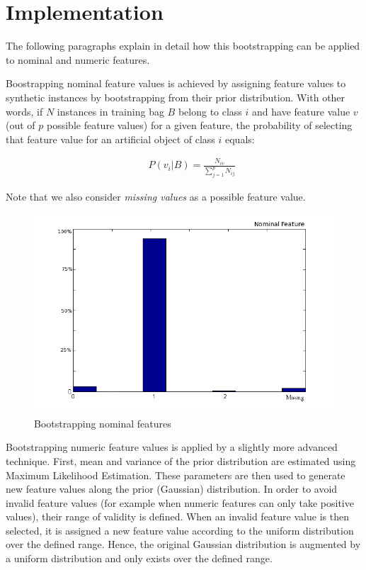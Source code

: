 \section{Implementation}\label{rnb-implementation}
The following paragraphs explain in detail how this bootstrapping can be applied to nominal and numeric features.

Boostrapping nominal feature values is achieved by assigning feature values to synthetic instances by bootstrapping from their prior distribution. With other words, if \(N\) instances in training bag $B$ belong to class \(i\) and have feature value $v$ (out of $p$ possible feature values) for a given feature, the probability of selecting that feature value for an artificial object of class $i$ equals:

\begin{eqnarray}
&& P(v_i|B)=\frac{N_{iv}}{\sum_{j=1}^p{N_{ij}}}
\end{eqnarray}

Note that we also consider \textit{missing values} as a possible feature value.

\begin{figure}[h]
\includegraphics[scale=0.65]{img/nominalEst.png}
\caption{Bootstrapping nominal features}
\end{figure}

Bootstrapping numeric feature values is applied by a slightly more advanced technique. First, mean and variance of the prior distribution are estimated using Maximum Likelihood Estimation. These parameters are then used to generate new feature values along the prior (Gaussian) distribution. In order to avoid invalid feature values (for example when numeric features can only take positive values), their range of validity is defined. When an invalid feature value is then selected, it is assigned a new feature value according to the uniform distribution over the defined range. Hence, the original Gaussian distribution is augmented by a uniform distribution and only exists over the defined range.

